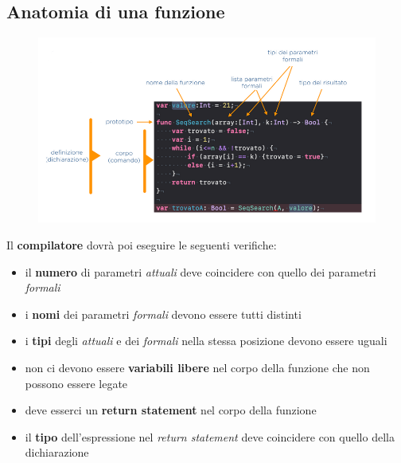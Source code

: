 \subsection{Anatomia di una funzione}
\begin{figure}[h!]
	\centering
	\includegraphics[width=13.5cm]{images/anatomia-funzione.png}
	\caption{}
\end{figure}
Il \textbf{compilatore} dovrà poi eseguire le seguenti verifiche:
\begin{itemize}
	\item il \textbf{numero} di parametri \emph{attuali} deve coincidere con quello dei parametri \emph{formali}
	\item i \textbf{nomi} dei parametri \emph{formali} devono essere tutti distinti
	\item i \textbf{tipi} degli \emph{attuali} e dei \emph{formali} nella stessa posizione devono essere uguali
	\item non ci devono essere \textbf{variabili libere} nel corpo della funzione che non possono essere legate
	\item deve esserci un \textbf{return statement} nel corpo della funzione
	\item il \textbf{tipo} dell'espressione nel \emph{return statement} deve coincidere con quello della dichiarazione
\end{itemize}
